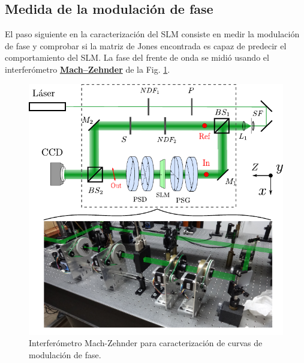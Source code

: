 \subsection{Medida de la modulación de fase}
El paso siguiente en la caracterización del SLM consiste en medir la
modulación de fase y comprobar si la matriz de Jones encontrada es
capaz de predecir el comportamiento del SLM. 
La fase del frente de onda se midió usando el interferómetro
\href{http://en.wikipedia.org/wiki/Mach–Zehnder_interferometer}{\bf{Mach–Zehnder}}
de la Fig. \ref{fig:mach_zehnder}. 
\begin{figure}[h!]
\centering
\includegraphics[scale=1.1]{mach_zehnder.pdf}
\caption[Interferómetro Mach-Zehnder para caracterización de curvas de
modulación de fase]{Interferómetro Mach-Zehnder para caracterización de curvas de
modulación de fase. }
\label{fig:mach_zehnder}
\end{figure}

